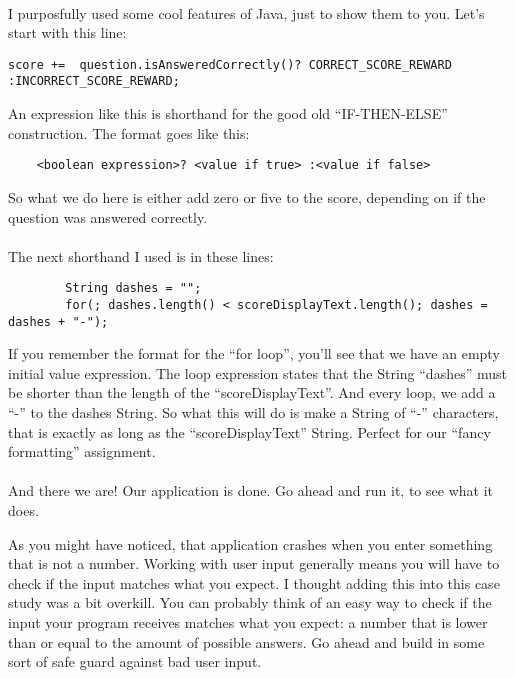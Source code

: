 \documentclass[11pt,fleqn]{book} %
\begin{document}
\paragraph{}I purposfully used some cool features of Java, just to show them to you. Let's start with this line:
\begin{lstlisting}
score +=  question.isAnsweredCorrectly()? CORRECT_SCORE_REWARD :INCORRECT_SCORE_REWARD;
\end{lstlisting}
An expression like this is shorthand for the good old ``IF-THEN-ELSE'' construction.
The format goes like this: 
\begin{verbatim}
	<boolean expression>? <value if true> :<value if false>
\end{verbatim}
So what we do here is either add zero or five to the score, depending on if the question was answered correctly.

\paragraph{}The next shorthand I used is in these lines:
\begin{lstlisting}
		String dashes = "";
		for(; dashes.length() < scoreDisplayText.length(); dashes = dashes + "-");
\end{lstlisting}
If you remember the format for the ``for loop'', you'll see that we have an empty initial value expression. The loop expression states that the String ``dashes'' must be shorter than the length of the ``scoreDisplayText''. And every loop, we add a ``-'' to the dashes String. So what this will do is make a String of ``-'' characters, that is exactly as long as the ``scoreDisplayText'' String. Perfect for our ``fancy formatting'' assignment.

\paragraph{}And there we are! Our application is done. Go ahead and run it, to see what it does.

\begin{exercise}
As you might have noticed, that application crashes when you enter something that is not a number. Working with user input generally means you will have to check if the input matches what you expect. I thought adding this into this case study was a bit overkill. You can probably think of an easy way to check if the input your program receives matches what you expect: a number that is lower than or equal to the amount of possible answers. Go ahead and build in some sort of safe guard against bad user input.
\end{exercise}
\end{document}
